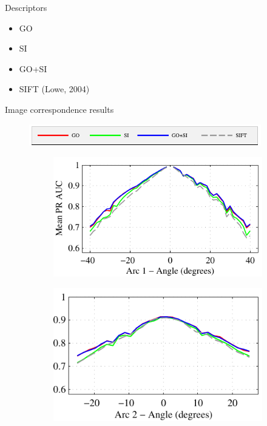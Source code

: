 \documentclass[14pt,t]{beamer}
\begin{document}
%
\begin{frame}[c]{Descriptors}
\begin{itemize}
	\item GO
	\vspace{0.4cm}
	\item SI
	\vspace{0.4cm}
	\item GO+SI
	\vspace{0.4cm}
	\item SIFT (Lowe, 2004)
\end{itemize}
\end{frame}
%
\begin{frame}{Image correspondence results}
\begin{figure}
	\hspace{0.6cm}\includegraphics[width=0.9\textwidth]{img/dtuResults_opponent_legend_cropped.pdf} \\
	\begin{subfigure}[t]{0.49\textwidth}
		\includegraphics[width=\textwidth]{img/dtuResultsPR_opponent_1.pdf}
	\end{subfigure}
	\begin{subfigure}[t]{0.447\textwidth}
		\includegraphics[width=\textwidth]{img/dtuResultsPR_opponent_2.pdf}

\end{subfigure}
\end{figure}
\end{frame}
\end{document}
